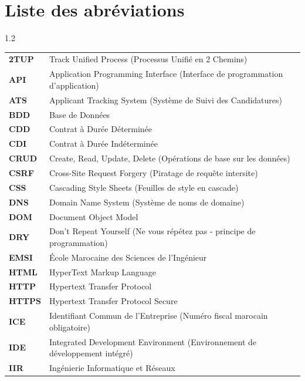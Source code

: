 \chapter*{Liste des abréviations}

\begin{spacing}{1.2}
\begin{longtable}{p{3cm} >{\raggedright\arraybackslash}p{11cm}}
    \textbf{2TUP} & 2 Track Unified Process (Processus Unifié en 2 Chemins) \\
    \textbf{API} & Application Programming Interface (Interface de programmation d'application) \\
    \textbf{ATS} & Applicant Tracking System (Système de Suivi des Candidatures) \\
    \textbf{BDD} & Base de Données \\
    \textbf{CDD} & Contrat à Durée Déterminée \\
    \textbf{CDI} & Contrat à Durée Indéterminée \\
    \textbf{CRUD} & Create, Read, Update, Delete (Opérations de base sur les données) \\
    \textbf{CSRF} & Cross-Site Request Forgery (Piratage de requête intersite) \\
    \textbf{CSS} & Cascading Style Sheets (Feuilles de style en cascade) \\
    \textbf{DNS} & Domain Name System (Système de noms de domaine) \\
    \textbf{DOM} & Document Object Model \\
    \textbf{DRY} & Don't Repeat Yourself (Ne vous répétez pas - principe de programmation) \\
    \textbf{EMSI} & École Marocaine des Sciences de l'Ingénieur \\
    \textbf{HTML} & HyperText Markup Language \\
    \textbf{HTTP} & Hypertext Transfer Protocol \\
    \textbf{HTTPS} & Hypertext Transfer Protocol Secure \\
    \textbf{ICE} & Identifiant Commun de l'Entreprise (Numéro fiscal marocain obligatoire) \\
    \textbf{IDE} & Integrated Development Environment (Environnement de développement intégré) \\
    \textbf{IIR} & Ingénierie Informatique et Réseaux \\

\end{longtable}
\end{spacing}
